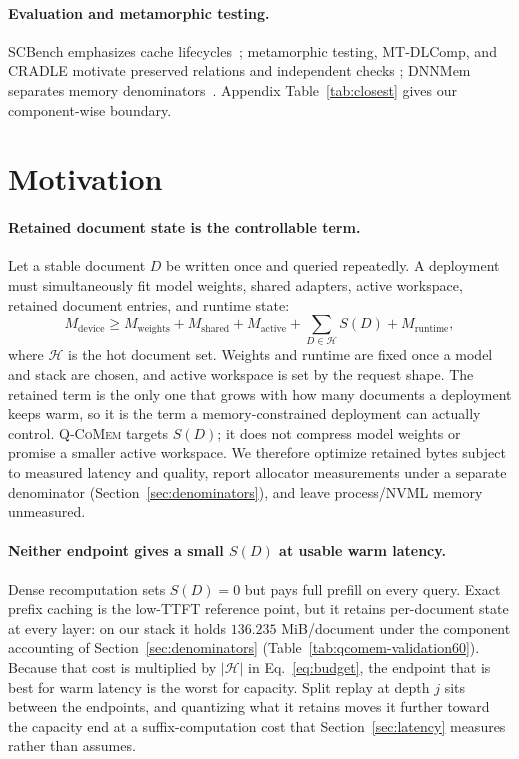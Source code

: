 \documentclass{article}
\newcommand{\qcomem}{\textsc{Q-CoMem}}
\begin{document}
\paragraph{Evaluation and metamorphic testing.}
SCBench emphasizes cache lifecycles~\citep{li2025scbench}; metamorphic testing,
MT-DLComp, and CRADLE motivate preserved relations and independent checks
\citep{chen2018metamorphic,xiao2022metamorphic,pham2019cradle}; DNNMem separates
memory denominators~\citep{gao2020dnnmem}.  Appendix Table~\ref{tab:closest}
gives our component-wise boundary.

\section{Motivation}
\label{sec:motivation}

\paragraph{Retained document state is the controllable term.}
Let a stable document $D$ be written once and queried repeatedly.  A deployment
must simultaneously fit model weights, shared adapters, active workspace,
retained document entries, and runtime state:
\begin{equation}
 M_{\mathrm{device}} \geq M_{\mathrm{weights}}+M_{\mathrm{shared}}
 +M_{\mathrm{active}}+\sum_{D\in\mathcal{H}}S(D)+M_{\mathrm{runtime}},
 \label{eq:budget}
\end{equation}
where $\mathcal{H}$ is the hot document set.  Weights and runtime are fixed once
a model and stack are chosen, and active workspace is set by the request shape.
The retained term is the only one that grows with how many documents a
deployment keeps warm, so it is the term a memory-constrained deployment can
actually control.  \qcomem{} targets $S(D)$; it does not compress model weights
or promise a smaller active workspace.  We therefore optimize retained bytes
subject to measured latency and quality, report allocator measurements under a
separate denominator (Section~\ref{sec:denominators}), and leave process/NVML
memory unmeasured.

\paragraph{Neither endpoint gives a small $S(D)$ at usable warm latency.}
Dense recomputation sets $S(D)=0$ but pays full prefill on every query.  Exact
prefix caching is the low-TTFT reference point, but it retains per-document
state at every layer: on our stack it holds $136.235$ MiB/document under the
component accounting of Section~\ref{sec:denominators}
(Table~\ref{tab:qcomem-validation60}).  Because that cost is multiplied by
$|\mathcal{H}|$ in Eq.~\ref{eq:budget}, the endpoint that is best for warm
latency is the worst for capacity.  Split replay at depth $j$ sits between the
endpoints, and quantizing what it retains moves it further toward the capacity
end at a suffix-computation cost that Section~\ref{sec:latency} measures rather
than assumes.
\end{document}
